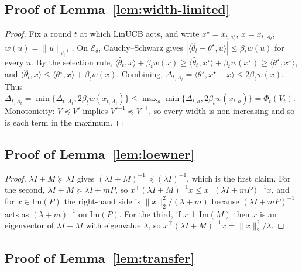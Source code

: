 \documentclass[anon]{alt2027} %
\newcommand{\wid}{w}
\begin{document}
\subsection{Proof of Lemma~\ref{lem:width-limited}}
\label{app:proof-width}

\begin{proof}
Fix a round $t$ at which LinUCB acts, and write $x^\star=x_{t,a_t^\star}$,
$x=x_{t,A_t}$, $\wid(u)=\|u\|_{V_t^{-1}}$. On $\mathcal E_\delta$, Cauchy--Schwarz
gives $|\langle\widehat\theta_t-\theta^\star,u\rangle|\le\beta_t\wid(u)$ for
every $u$. By the selection rule,
$\langle\widehat\theta_t,x\rangle+\beta_t\wid(x)\ge\langle\widehat\theta_t,x^\star\rangle+\beta_t\wid(x^\star)\ge\langle\theta^\star,x^\star\rangle$,
and $\langle\widehat\theta_t,x\rangle\le\langle\theta^\star,x\rangle+\beta_t\wid(x)$.
Combining, $\Delta_{t,A_t}=\langle\theta^\star,x^\star-x\rangle\le2\beta_t\wid(x)$.
Thus $\Delta_{t,A_t}=\min\{\Delta_{t,A_t},2\beta_t\wid(x_{t,A_t})\}\le\max_a\min\{\Delta_{t,a},2\beta_t\wid(x_{t,a})\}=\Phi_t(V_t)$.
Monotonicity: $V\preceq V'$ implies $V'^{-1}\preceq V^{-1}$, so every width is
non-increasing and so is each term in the maximum.
\end{proof}

\subsection{Proof of Lemma~\ref{lem:loewner}}
\label{app:proof-loewner}

\begin{proof}
$\lambda I+M\succeq\lambda I$ gives $(\lambda I+M)^{-1}\preceq(\lambda I)^{-1}$,
which is the first claim. For the second, $\lambda I+M\succeq\lambda I+mP$, so
$x^\top(\lambda I+M)^{-1}x\le x^\top(\lambda I+mP)^{-1}x$, and for
$x\in\mathrm{Im}(P)$ the right-hand side is $\|x\|_2^2/(\lambda+m)$ because
$(\lambda I+mP)^{-1}$ acts as $(\lambda+m)^{-1}$ on $\mathrm{Im}(P)$. For the
third, if $x\perp\mathrm{Im}(M)$ then $x$ is an eigenvector of $\lambda I+M$
with eigenvalue $\lambda$, so $x^\top(\lambda I+M)^{-1}x=\|x\|_2^2/\lambda$.
\end{proof}

\subsection{Proof of Lemma~\ref{lem:transfer}}
\label{app:proof-transfer}
\end{document}
